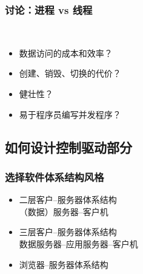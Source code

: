 \documentclass[compress]{beamer}
\begin{document}
\begin{frame}
  \frametitle{讨论：进程 vs 线程}
   \\[2ex]

  \begin{itemize}
    \item 数据访问的成本和效率？
    \item 创建、销毁、切换的代价？
    \item 健壮性？
    \item 易于程序员编写并发程序？
  \end{itemize}
\end{frame}

\subsection[如何设计]{如何设计控制驱动部分}

\begin{frame}
  \frametitle{选择软件体系结构风格}

  \begin{itemize}
    \item 二层客户--服务器体系结构 \\
    （数据）服务器--客户机
    \item 三层客户--服务器体系结构 \\
    数据服务器--应用服务器--客户机 
    \item 浏览器--服务器体系结构
  \end{itemize}
\end{frame}
\end{document}
